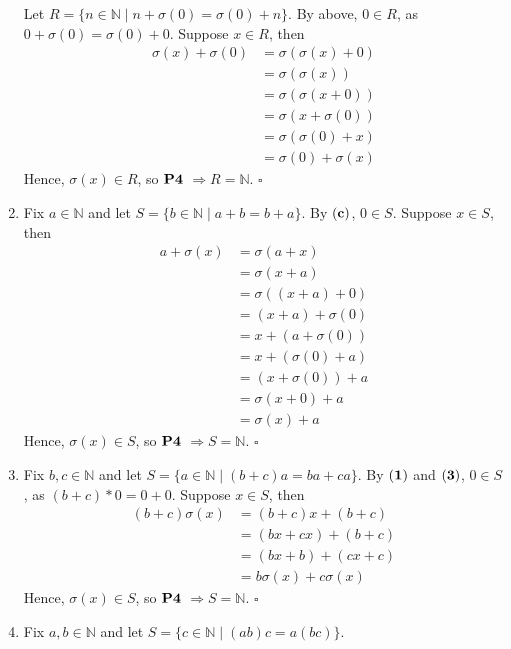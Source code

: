 \documentclass{article}
\begin{document}
\begin{enumerate}[label=\textbf{(\alph*)}]
{	Let
	$ R = \{ n \in \mathbb{N} \mid
		n+\sigma(0) = \sigma(0) + n \}
	$. By above, $0 \in R$, as
	$ 0 + \sigma(0) = \sigma(0) + 0$.
	Suppose $x \in R$, then
	\begin{align*}
		\sigma(x)+\sigma(0) &= \sigma(\sigma(x) + 0)	\tag{2} \\
		  &= \sigma(\sigma(x))			\tag{1} \\
		  &= \sigma(\sigma(x+0))		\tag{1} \\
		  &= \sigma(x+\sigma(0))		\tag{2} \\
		  &= \sigma(\sigma(0)+x)		\tag{IH} \\
		  &= \sigma(0) + \sigma(x)		\tag{2}
	\end{align*}
	Hence, $\sigma(x) \in R$, so $\bf{P4}$
	$\Rightarrow R = \mathbb{N}$.
	\hfill $\square$
}
\item{
	Fix $a \in \mathbb{N}$ and let
	$S=\{b \in \mathbb{N} \mid a+b=b+a \}$.
	By $\bf{(c)}$, $0 \in S$.
	Suppose $x \in S$, then
	\begin{align*}
		a+\sigma(x) &= \sigma(a+x)		\tag{2} \\
					&= \sigma(x+a)		\tag{IH}\\
					&= \sigma((x+a)+0)	\tag{1} \\
					&= (x+a)+\sigma(0)	\tag{2} \\
					&= x+(a+\sigma(0))	\tag{b} \\
					&= x+(\sigma(0)+a)	\tag{c} \\
					&= (x+\sigma(0))+a	\tag{b} \\
					&= \sigma(x+0)+a	\tag{2} \\
					&= \sigma(x)+a		\tag{1}
	\end{align*}
	Hence, $\sigma(x) \in S$, so $\bf{P4}$
	$\Rightarrow S = \mathbb{N}$.
	\hfill $\square$
}
\item{
	Fix $b,c \in \mathbb{N}$ and let
	$S=\{ a \in \mathbb{N} \mid (b+c)a = ba + ca \}$.
	By $\bf{(1)}$ and $\bf{(3)}$, $0 \in S$, as
	$(b+c)*0 = 0 + 0$.
	Suppose $x \in S$, then
	\begin{align*}
		(b+c)\sigma(x) &= (b+c)x+(b+c)	\tag{4} \\
			&= (bx+cx)+(b+c)			\tag{IH}\\
			&= (bx+b)+(cx+c)			\tag{b,d}\\
			&= b\sigma(x)+c\sigma(x)	\tag{4}
	\end{align*}
	Hence, $\sigma(x) \in S$, so $\bf{P4}$
	$\Rightarrow S = \mathbb{N}$.
	\hfill $\square$
}
\item{
	Fix $a,b \in \mathbb{N}$ and let
	$S=\{c \in \mathbb{N} \mid (ab)c=a(bc) \}$.
}
\end{enumerate}
\end{document}
